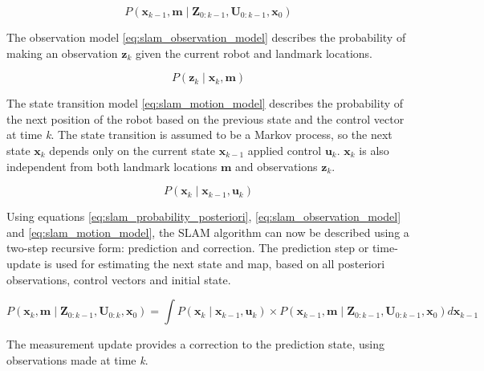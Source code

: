 \begin{equation} \label{eq:slam_probability_posteriori}
    P\left ( \mathbf{x}_{k-1},\mathbf{m}\mid \mathbf{Z}_{0:k-1},\mathbf{U}_{0:k-1},\mathbf{x}_{0}\right )
\end{equation}

The observation model \ref{eq:slam_observation_model} describes the probability of making an observation 
$\mathbf{z}_{k}$ given the current robot and landmark locations.

\begin{equation} \label{eq:slam_observation_model}
    P\left ( \mathbf{z}_{k}\mid \mathbf{x}_{k},\mathbf{m} \right )
\end{equation}

The state transition model \ref{eq:slam_motion_model} describes the probability of the next position of the robot 
based on the previous state and the control vector at time \emph{k}. The state transition is assumed to be a Markov
process, so the next state $\mathbf{x}_{k}$ depends only on the current state $\mathbf{x}_{k-1}$ applied control 
$\mathbf{u}_{k}$. $\mathbf{x}_{k}$ is also independent from both landmark locations $\mathbf{m}$ and observations
$\mathbf{z}_{k}$.

\begin{equation} \label{eq:slam_motion_model}
    P\left ( \mathbf{x}_{k}\mid \mathbf{x}_{k-1},\mathbf{u}_{k} \right )
\end{equation}

Using equations \ref{eq:slam_probability_posteriori}, \ref{eq:slam_observation_model} and \ref{eq:slam_motion_model},
the SLAM algorithm can now be described using a two-step recursive form: prediction and correction.
The prediction step or time-update is used for estimating the next state and map, based on all posteriori observations,
control vectors and initial state. 

\begin{equation} \label{eq:slam_time_update}
    P\left ( \mathbf{x}_{k}, \mathbf{m}\mid \mathbf{Z}_{0:k-1}, \mathbf{U}_{0:k}, \mathbf{x}_{0} \right )=
        \int 
            P\left ( \mathbf{x}_{k}\mid \mathbf{x}_{k-1}, \mathbf{u}_{k} \right ) 
            \times  
            P\left ( \mathbf{x}_{k-1}, \mathbf{m}  \mid  \mathbf{Z}_{0:k-1}, \mathbf{U}_{0:k-1}, \mathbf{x}_{0}\right )
        d\mathbf{x}_{k-1}
\end{equation}

The measurement update provides a correction to the prediction state, using observations made at time \emph{k}.

